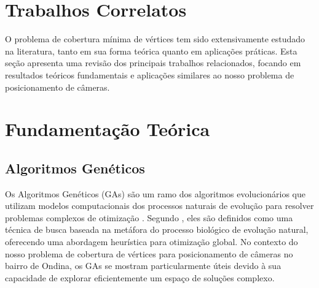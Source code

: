 \documentclass[12pt, a4paper]{report}
\begin{document}
\chapter{Trabalhos Correlatos}
O problema de cobertura mínima de vértices tem sido extensivamente estudado na literatura, tanto em sua forma teórica quanto em aplicações práticas. Esta seção apresenta uma revisão dos principais trabalhos relacionados, focando em resultados teóricos fundamentais e aplicações similares ao nosso problema de posicionamento de câmeras.

\chapter{Fundamentação Teórica}

\section{Algoritmos Genéticos}
Os Algoritmos Genéticos (GAs) são um ramo dos algoritmos evolucionários que utilizam modelos computacionais dos processos naturais de evolução para resolver problemas complexos de otimização \cite{Holland1975}. Segundo \cite{Linden2006}, eles são definidos como uma técnica de busca baseada na metáfora do processo biológico de evolução natural, oferecendo uma abordagem heurística para otimização global. No contexto do nosso problema de cobertura de vértices para posicionamento de câmeras no bairro de Ondina, os GAs se mostram particularmente úteis devido à sua capacidade de explorar eficientemente um espaço de soluções complexo.
\end{document}
